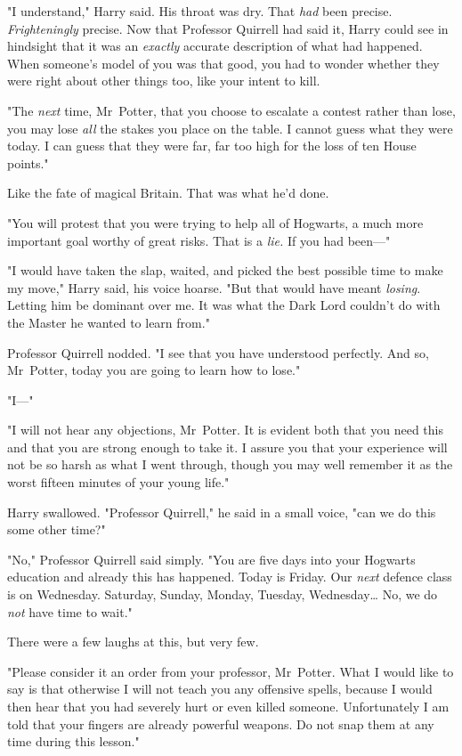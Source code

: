 "I understand," Harry said. His throat was dry. That \emph{had} been precise.
\emph{Frighteningly} precise. Now that Professor Quirrell had said it, Harry
could see in hindsight that it was an \emph{exactly} accurate description of
what had happened. When someone's model of you was that good, you had to wonder
whether they were right about other things too, like your intent to kill.

"The \emph{next} time, Mr~Potter, that you choose to escalate a contest rather
than lose, you may lose \emph{all} the stakes you place on the table. I cannot
guess what they were today. I can guess that they were far, far too high for
the loss of ten House points."

Like the fate of magical Britain. That was what he'd done.

"You will protest that you were trying to help all of Hogwarts, a much more
important goal worthy of great risks. That is a \emph{lie.} If you had been---"

"I would have taken the slap, waited, and picked the best possible time to make
my move," Harry said, his voice hoarse. "But that would have meant
\emph{losing}. Letting him be dominant over me. It was what the Dark Lord
couldn't do with the Master he wanted to learn from."

Professor Quirrell nodded. "I see that you have understood perfectly. And so,
Mr~Potter, today you are going to learn how to lose."

"I---"

"I will not hear any objections, Mr~Potter. It is evident both that you need
this and that you are strong enough to take it. I assure you that your
experience will not be so harsh as what I went through, though you may well
remember it as the worst fifteen minutes of your young life."

Harry swallowed. "Professor Quirrell," he said in a small voice, "can we do
this some other time?"

"No," Professor Quirrell said simply. "You are five days into your Hogwarts
education and already this has happened. Today is Friday. Our \emph{next}
defence class is on Wednesday. Saturday, Sunday, Monday, Tuesday,
Wednesday{\ldots} No, we do \emph{not} have time to wait."

There were a few laughs at this, but very few.

"Please consider it an order from your professor, Mr~Potter. What I would like
to say is that otherwise I will not teach you any offensive spells, because I
would then hear that you had severely hurt or even killed someone.
Unfortunately I am told that your fingers are already powerful weapons. Do not
snap them at any time during this lesson."

